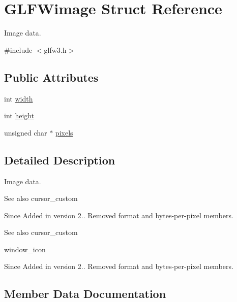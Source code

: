 \hypertarget{structGLFWimage}{}\section{G\+L\+F\+Wimage Struct Reference}
\label{structGLFWimage}


Image data.  




{\ttfamily \#include $<$glfw3.\+h$>$}

\subsection*{Public Attributes}
\begin{DoxyCompactItemize}
\item 
int \hyperlink{structGLFWimage_af6a71cc999fe6d3aea31dd7e9687d835}{width}
\item 
int \hyperlink{structGLFWimage_a0b7d95368f0c80d5e5c9875057c7dbec}{height}
\item 
unsigned char $\ast$ \hyperlink{structGLFWimage_a65a8d70274a35e7342f87703e233a70c}{pixels}
\end{DoxyCompactItemize}


\subsection{Detailed Description}
Image data. 

\begin{DoxySeeAlso}{See also}
cursor\+\_\+custom
\end{DoxySeeAlso}
\begin{DoxySince}{Since}
Added in version 2..  Removed format and bytes-\/per-\/pixel members.
\end{DoxySince}
\begin{DoxySeeAlso}{See also}
cursor\+\_\+custom 

window\+\_\+icon
\end{DoxySeeAlso}
\begin{DoxySince}{Since}
Added in version 2..  Removed format and bytes-\/per-\/pixel members. 
\end{DoxySince}


\subsection{Member Data Documentation}
\mbox{\label{structGLFWimage_a0b7d95368f0c80d5e5c9875057c7dbec}} 
